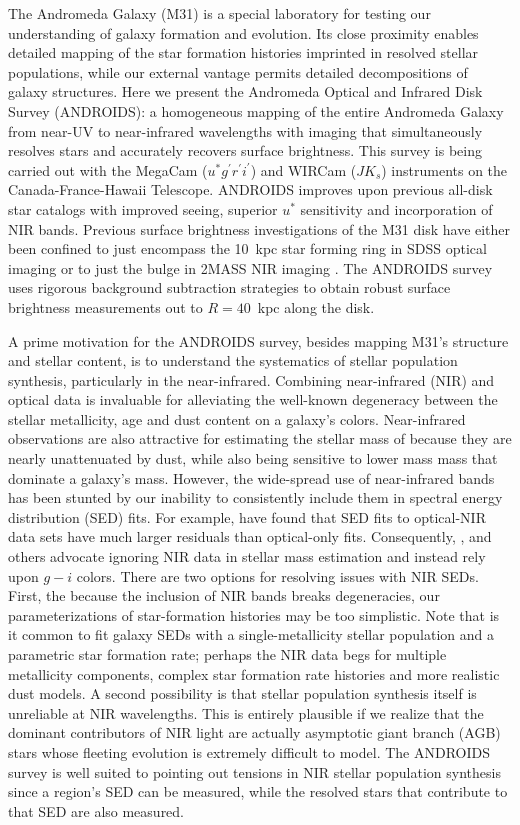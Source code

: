 \documentclass[11pt,twoside]{article}
\begin{document}
The Andromeda Galaxy (M31) is a special laboratory for testing our understanding of galaxy formation and evolution.
Its close proximity enables detailed mapping of the star formation histories imprinted in resolved stellar populations, while our external vantage permits detailed decompositions of galaxy structures.
Here we present the Andromeda Optical and Infrared Disk Survey (ANDROIDS): a homogeneous mapping of the entire Andromeda Galaxy from near-UV to near-infrared wavelengths with imaging that simultaneously resolves stars and accurately recovers surface brightness.
This survey is being carried out with the MegaCam ($u^*g^\prime r^\prime i^\prime$) and WIRCam ($JK_s$) instruments on the Canada-France-Hawaii Telescope.
ANDROIDS improves upon previous all-disk star catalogs \citep[e.g., the Local Group Galaxy Survey][]{Massey:2006} with improved seeing, superior $u^*$ sensitivity and incorporation of NIR bands.
Previous surface brightness investigations of the M31 disk have either been confined to just encompass the 10~kpc star forming ring in SDSS optical imaging \citep{Tamm:2012} or to just the bulge in 2MASS NIR imaging \cite{Beaton:2007}.
The ANDROIDS survey uses rigorous background subtraction strategies to obtain robust surface brightness measurements out to $R=40$~kpc along the disk.

A prime motivation for the ANDROIDS survey, besides mapping M31's structure and stellar content, is to understand the systematics of stellar population synthesis, particularly in the near-infrared.
Combining near-infrared (NIR) and optical data is invaluable for alleviating the well-known degeneracy between the stellar metallicity, age and dust content on a galaxy's colors.
Near-infrared observations are also attractive for estimating the stellar mass of because they are nearly unattenuated by dust, while also being sensitive to lower mass mass that dominate a galaxy's mass.
However, the wide-spread use of near-infrared bands has been stunted by our inability to consistently include them in spectral energy distribution (SED) fits.
For example, \cite{Taylor:2011} have found that SED fits to optical-NIR data sets have much larger residuals than optical-only fits.
Consequently, \cite{Zibetti:2009}, \cite{Taylor:2011} and others advocate ignoring NIR data in stellar mass estimation and instead rely upon $g-i$ colors.
There are two options for resolving issues with NIR SEDs.
First, the because the inclusion of NIR bands breaks degeneracies, our parameterizations of star-formation histories may be too simplistic.
Note that is it common to fit galaxy SEDs with a single-metallicity stellar population and a parametric star formation rate; perhaps the NIR data begs for multiple metallicity components, complex star formation rate histories and more realistic dust models.
A second possibility is that stellar population synthesis itself is unreliable at NIR wavelengths.
This is entirely plausible if we realize that the dominant contributors of NIR light are actually asymptotic giant branch (AGB) stars whose fleeting evolution is extremely difficult to model.
The ANDROIDS survey is well suited to pointing out tensions in NIR stellar population synthesis since a region's SED can be measured, while the resolved stars that contribute to that SED are also measured.
\end{document}
